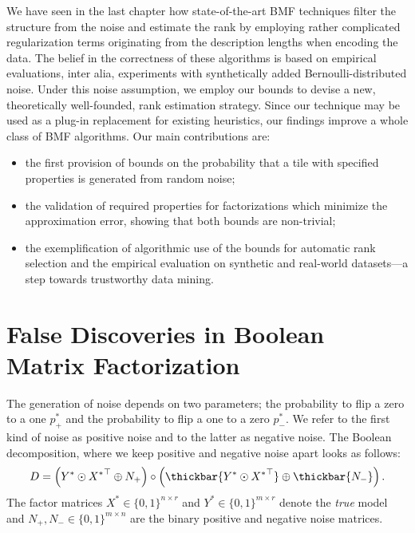 We have seen in the last chapter how state-of-the-art BMF techniques filter the structure from the noise and estimate the rank by employing rather complicated regularization terms originating from the description lengths when encoding the data. The belief in the correctness of these algorithms is based on empirical evaluations, inter alia, experiments with synthetically added Bernoulli-distributed noise. 
Under this noise assumption, we employ our bounds to devise a new, theoretically well-founded, rank estimation strategy. Since our technique may be used as a plug-in replacement for existing heuristics, our findings improve a whole class of BMF algorithms.
Our main contributions are:
\begin{itemize}
\item the first provision of bounds on the probability that a tile with specified properties is generated from random noise;
\item the validation of required properties for factorizations which minimize the approximation error, showing that both bounds are non-trivial;
\item the exemplification of algorithmic use of the bounds for automatic rank selection and the empirical evaluation on synthetic and real-world datasets---a step towards trustworthy data mining. 
\end{itemize}
\section{False Discoveries in Boolean Matrix Factorization}\label{sec:TP:boundingFDR}
The generation of noise depends on two parameters; the probability to flip a zero to a one $p_+^*$ and the probability to flip a one to a zero $p_-^*$. We refer to the first kind of noise as positive noise and to the latter as negative noise. The Boolean decomposition, where we keep positive and negative noise apart looks as follows:
\begin{align}\label{eq:BMF0}
D=\left(Y^*\odot {X^*}^\top \oplus N_+\right) \circ \left(\thickbar{Y^*\odot {X^*}^\top} \oplus \thickbar{N_-}\right).
\end{align}
The factor matrices $X^*\in\{0,1\}^{n\times r}$ and $Y^*\in\{0,1\}^{m\times r}$ denote the \emph{true} model and $N_+,N_-\in\{0,1\}^{m\times n}$ are the binary positive and negative noise matrices. 

